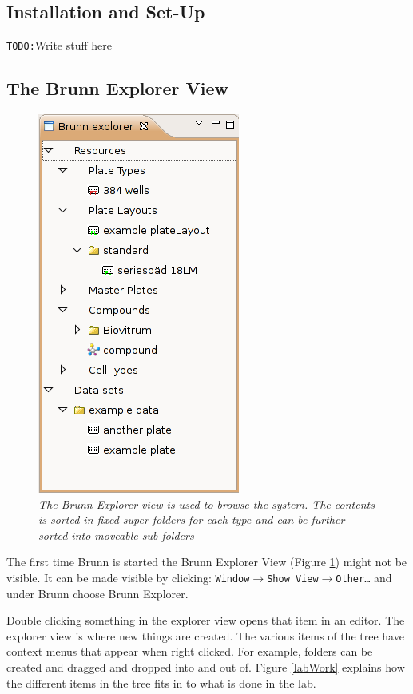 \documentclass[a4paper,10pt]{article}
\begin{document}
         \subsection{Installation and Set-Up}
         \texttt{TODO:}Write stuff here

         \subsection{The Brunn Explorer View} 
            \begin{figure}
                \begin{center}
                    \includegraphics[width=.2\textwidth]
                                    {images/explorerView.png}
                \end{center}
                \caption{\textit{The Brunn Explorer view is used to browse the
                    system. The contents is sorted in fixed super folders for
                    each type and can be further sorted into moveable sub
                    folders }}
                \label{explorerView}
            \end{figure}

            \noindent
            The first time Brunn is started the Brunn Explorer View (Figure
            \ref{explorerView}) might not be visible. It can be made visible by
            clicking: \texttt{Window$\rightarrow$Show
            View$\rightarrow$Other\ldots} and under Brunn choose Brunn
            Explorer. 

            Double clicking something in the explorer view opens that item in
            an editor. The explorer view is where new things are created. The
            various items of the tree have context menus that appear when right
            clicked. For example, folders can be created and dragged and
            dropped into and out of. Figure \ref{labWork} explains how the
            different items in the tree fits in to what is done in the lab.
            
\end{document}
